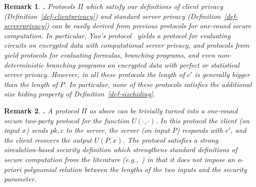 \documentclass{article}
\newcommand{\full}[1]{#1}
\newtheorem{REMARK}{Remark}[section]
\newenvironment{remark}{\begin{REMARK} \hspace{-.85em} {\bf .} \rm}%
	{\end{REMARK}}
\begin{document}
\begin{remark}
Protocols $\Pi$ which satisfy our definitions of client privacy
(Definition~\ref{def-clientprivacy}) and standard server privacy
(Definition~\ref{def-serverprivacy}) can be easily derived from
previous protocols for one-round secure computation. In particular,
Yao's protocol~\cite{yao86}
yields a protocol for evaluating circuits on encrypted data with
computational server privacy, and protocols
from~\cite{syy99,K,FKN94,ik00,beaver00,Rap,Kol} yield protocols for
evaluating formulas, branching programs, and even non-deterministic
branching programs on encrypted data with perfect or statistical
server privacy. However, in all these protocols the length of $c'$
is generally bigger than the length of $P$. In particular, none of
these protocols satisfies the additional size hiding property of
Definition~\ref{def-sizehiding}.
\end{remark}

\full{
\begin{remark}
A protocol $\Pi$ as above can be trivially turned into a one-round
secure two-party protocol for the function $U(\cdot,\cdot)$. In
this protocol the client (on input $x$) sends $pk,c$ to the server,
the server (on input $P$) responds with $c'$, and the client
recovers the output $U(P,x)$. The protocol satisfies a strong
simulation-based security definition which strengthens standard
definitions of secure computation from the literature
(e.g.,~\cite{canetti01,Goldbook}) in that it does not impose an a-priori
polynomial relation between the lengths of the two inputs and the
security parameter.
\end{remark}
}

\end{document}
